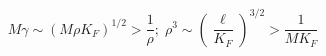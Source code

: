 \begin{equation}
\label{mrho}
M\gamma \sim (M\rho K_F)^{1/2}>\frac{1}{\rho};\;\rho^3\sim (\frac{\ell}{K_F})^{3/2}>\frac{1}{MK_F}
\end{equation}

